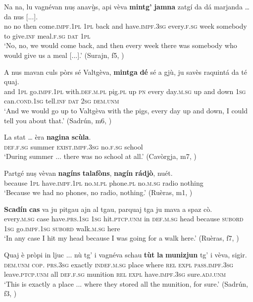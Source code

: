 \ea\label{ex:mintga1}
\gll Na na, lu vagnévan nuṣ anav{\`u̱̱}s, api vèva \textbf{mintg’} \textbf{jamna} zatgí da dá marjanda … da nus [...].\\
no no then come.\textsc{impf.1pl} \textsc{1pl} back and have.\textsc{impf.3sg} every.\textsc{f.sg}  week somebody to give.\textsc{inf} meal.\textsc{f.sg} {} \textsc{dat} \textsc{1pl}\\
\glt `No, no, we would come back, and then every week there was somebody who would give us a meal [...].' (Surajn, f5, )
\z

\ea
\label{ex:mintga2}
\gll    A nus mavan culs pòrs sé Valtgèva, \textbf{mintga} \textbf{dé} sé a gjù, ju savès raquintá da té quaj.\\
and \textsc{1pl}  go.\textsc{impf.1pl} with.\textsc{def.m.pl} pig.\textsc{pl} up \textsc{pn} every day.\textsc{m.sg} up and down  \textsc{1sg}  can.\textsc{cond.1sg}  tell.\textsc{inf}  \textsc{dat}  \textsc{2sg} \textsc{dem.unm}\\
\glt `And we would go up to Valtgèva with the pigs, every day up and down, I could tell you about that.' (Sadrún, m6, )
\z

\ea
\label{ex:nagina1}
\gll La stat … èra \textbf{nagina} \textbf{scùla}.  \\
\textsc{def.f.sg} summer {} \textsc{exist.impf.3sg} no.\textsc{f.sg} school \\
\glt `During summer ... there was no school at all.' (Cavòrgja, m7, )
\z

\ea
\label{ex:nagina2}
\gll Partgé nuṣ vèvan \textbf{nagíns} \textbf{talafòns}, \textbf{nagín} \textbf{rádjò}, nuét.\\
because \textsc{1pl} have.\textsc{impf.1pl} no.\textsc{m.pl} phone.\textsc{pl} no.\textsc{m.sg} radio nothing\\
\glt `Because we had no phones, no radio, nothing.' (Ruèras, m1, )
\z

\ea
\label{ex:scadin1}
\gll \textbf{Scadín} \textbf{cas} va ju pitgau ajn al tgau, parquaj tga ju mava a spaz cò.   \\
every.\textsc{m.sg} case have.\textsc{prs.1sg} \textsc{1sg} hit.\textsc{ptcp.unm} in \textsc{def.m.sg} head because \textsc{subord} \textsc{1sg} go.\textsc{impf.1sg} \textsc{subord} walk.\textsc{m.sg} here \\
\glt `In any case I hit my head because I was going for a walk here.' (Ruèras, f7, )
\z

\ea
\label{ex:tutla1}
\gll  Quaj è pròpi in ljuc ... nù tg’ i vagnéva schau \textbf{tùt} \textbf{la} \textbf{munizjun} tg’ i vèva, sigir.\\
\textsc{dem.unm} \textsc{cop. prs.3sg} exactly \textsc{indef.m.sg} place {} where \textsc{rel} \textsc{expl} \textsc{pass.impf.3sg} leave.\textsc{ptcp.unm} all \textsc{def.f.sg} munition \textsc{rel} \textsc{expl} have.\textsc{impf.3sg} sure.\textsc{adj.unm}\\
\glt `This is exactly a place ... where they stored all the munition, for sure.' (Sadrún, f3, )
\z

